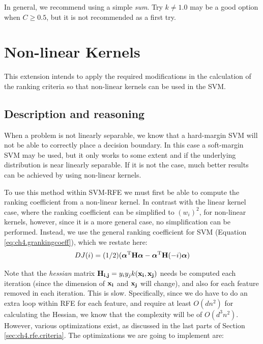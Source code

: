 In general, we recommend using a simple \emph{sum}. Try $k \neq 1.0$ may be a good option when $C \ge 0.5$, but it is not recommended as a first try. 


\section{Non-linear Kernels}

This extension intends to apply the required modifications in the calculation of the ranking criteria so that non-linear kernels can be used in the SVM.

\subsection{Description and reasoning}
\label{sec:ch5.kernel.desc}

When a problem is not linearly separable, we know that a hard-margin SVM will not be able to correctly place a decision boundary. In this case a soft-margin SVM may be used, but it only works to some extent and if the underlying distribution is near linearly separable. If it is not the case, much better results can be achieved by using non-linear kernels.

To use this method within SVM-RFE we must first be able to compute the ranking coefficient from a non-linear kernel. In contrast with the linear kernel case, where the ranking coefficient can be simplified to $(w_i)^2$, for non-linear kernels, however, since it is a more general case, no simplification can be performed. Instead, we use the general ranking coefficient for SVM (Equation \ref{eq:ch4.grankingcoeff}), which we restate here:
\begin{align*}
    DJ(i) = (1/2)(\boldsymbol{\alpha}^{\text{T}} \mathbf{H} \boldsymbol{\alpha} - \boldsymbol{\alpha}^{\text{T}} \mathbf{H}(-i) \boldsymbol{\alpha})
\end{align*}

Note that the \emph{hessian} matrix $\mathbf{H_{i,j}} = y_iy_jk(\mathbf{x_i}, \mathbf{x_j})$ needs be computed each iteration (since the dimension of $\mathbf{x_i}$ and $\mathbf{x_j}$ will change), and also for each feature removed in each iteration. This is slow. Specifically, since we do have to do an extra loop within RFE for each feature, and require at least $O(dn^2)$ for calculating the Hessian, we know that the complexity will be of $O(d^3n^2)$. However, various optimizations exist, as discussed in the last parts of Section \ref{sec:ch4.rfe.criteria}. The optimizations we are going to implement are:

